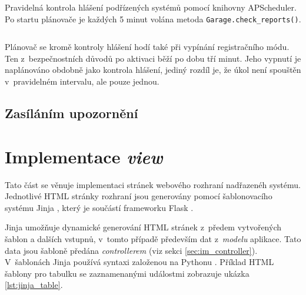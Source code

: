 \begin{listing}[htbp]
\caption{\label{lst:scheduler_check} Pravidelná kontrola hlášení podřízených systémů pomocí knihovny APScheduler. Po startu plánovače je každých 5 minut volána metoda \texttt{Garage.check\_reports()}.}
\inputminted[bgcolor=codebg]{python}{source-samples/scheduler_check.py}
\end{listing}

Plánovač se kromě kontroly hlášení hodí také při vypínání registračního módu. Ten z~bezpečnostních důvodů po aktivaci běží po dobu tří minut. Jeho vypnutí je naplánováno obdobně jako kontrola hlášení, jediný rozdíl je, že úkol není spouštěn v~pravidelném intervalu, ale pouze jednou.

\subsection{Zasíláním upozornění}






\section{Implementace \textit{view}}

Tato část se věnuje implementaci stránek webového rozhraní nadřazenéh systému. Jednotlivé HTML stránky rozhraní jsou generovány pomocí šablonovacího systému Jinja \cite{jinja}, který je součástí frameworku Flask \cite{flask_templates}. 

Jinja umožňuje dynamické generování HTML stránek z~předem vytvořených šablon a dalších vstupnů, v~tomto případě především dat z~\textit{modelu} aplikace. Tato data jsou šabloně předána \textit{controllerem} (viz sekci \ref{sec:im_controller}). V~šablonách Jinja používá syntaxi založenou na Pythonu \cite{jinja}. Příklad HTML šablony pro tabulku se zaznamenanými událostmi zobrazuje ukázka \ref{lst:jinja_table}.


